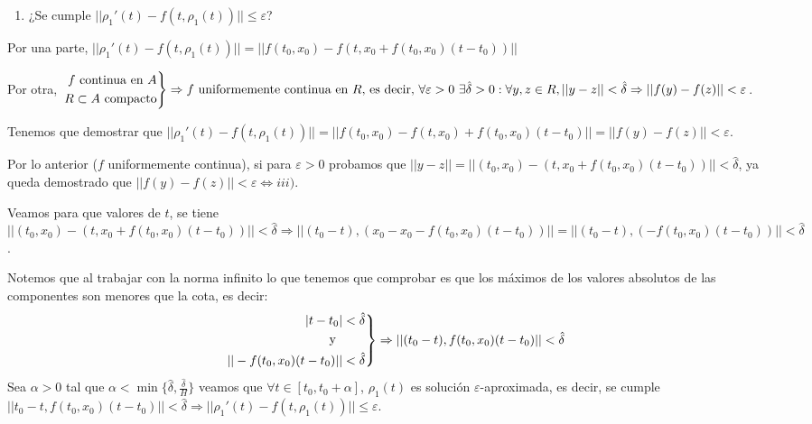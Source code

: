 \documentclass{article}
\makeatletter
\newenvironment{rcases}
{\left.\begin{aligned}}
	{\end{aligned}\right\rbrace}
\theoremstyle{theorem-style}  %
\theoremstyle{definition-style}
\theoremstyle{example-style}
\renewenvironment{proof}[1][\proofname]{\par
	\pushQED{\qed}%
	\normalfont \topsep6\p@\@plus6\p@\relax
	\list{}{%
		\settowidth{\leftmargin}{\quad:\hskip\labelsep}%
		\setlength{\labelwidth}{0pt}%
		\setlength{\itemindent}{-\leftmargin}%
	}%
	\item[\hskip\labelsep\itshape#1\@addpunct{:}]\ignorespaces
}{%
	\popQED\endlist\@endpefalse
}
\makeatother
\begin{document}
\begin{proof}
\begin{enumerate}[\qquad i)]
		\item ¿Se cumple $ ||\rho_1'(t)-f(t,\rho_1(t))||\leq \varepsilon $?
	\end{enumerate}
	
	Por una parte, $ ||\rho_1'(t)-f(t,\rho_1(t))||=||f(t_0,x_0)-f(t,x_0+f(t_0,x_0)(t-t_0))||  $
	
	Por otra, $ \begin{rcases}
	f \text{ continua en } A\\
	R\subset A \text{ compacto}
	\end{rcases} \Rightarrow f \text{ uniformemente continua en } R\text{, es decir, } \forall \varepsilon > 0 \ \exists \hat{\delta} >0 : \forall y,z \in R, ||y-z||<\hat{\delta} \Rightarrow||f(y)-f(z)||<\varepsilon $.
	
	Tenemos que demostrar que $ ||\rho_1'(t)-f(t,\rho_1(t))||=||f(t_0,x_0)-f(t,x_0)+f(t_0,x_0)(t-t_0)||=||f(y)-f(z)||<\varepsilon $. 
	
	Por lo anterior ($ f $ uniformemente continua), si para $ \varepsilon>0 $ probamos que $||y-z||=||(t_0,x_0)-(t, x_0+f(t_0,x_0)(t-t_0))||< \hat{\delta} $, ya queda demostrado que $ ||f(y)-f(z)||<\varepsilon \Leftrightarrow iii) $.
	
	Veamos para que valores de $ t $, se tiene $ ||(t_0,x_0)-(t, x_0+f(t_0,x_0)(t-t_0))||< \hat{\delta} \Rightarrow ||(t_0-t),( x_0-x_0 -f(t_0,x_0)(t-t_0))||=||(t_0-t),(-f(t_0,x_0)(t-t_0))||< \hat{\delta} $.
	
	Notemos que al trabajar con la norma infinito lo que tenemos que comprobar es que los máximos de los valores absolutos de las componentes son menores que la cota, es decir:	
	\[ \begin{rcases}
	 |t-t_0|< \hat{\delta}\\
	 \text{ y }\qquad\\
	|| -f(t_0,x_0)(t-t_0)||< \hat{\delta}
	\end{rcases} \Rightarrow ||(t_0-t), f(t_0,x_0)(t-t_0)||< \hat{\delta} \]
	Sea $ \alpha >0 $ tal que $ \alpha < \min \{ \hat{\delta}, \frac{\hat{\delta}}{H}\} $ veamos que $ \forall t \in [t_0,t_0+\alpha] $, $\rho_1(t)$ es solución $ \varepsilon $-aproximada, es decir, se cumple $ ||t_0-t,f(t_0,x_0)(t-t_0)||< \hat{\delta}\Rightarrow ||\rho_1'(t)-f(t,\rho_1(t))||\leq \varepsilon $.
	

\end{proof}
\end{document}
